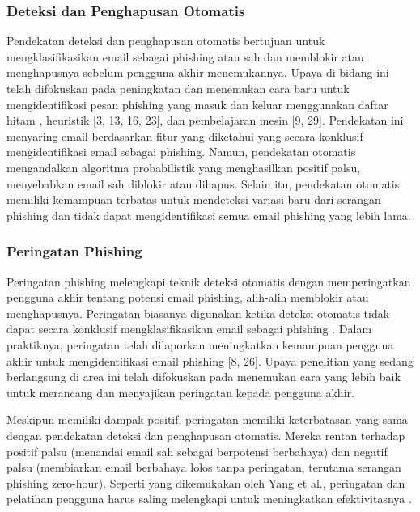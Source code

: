 \documentclass[lettersize,journal]{IEEEtran}
\begin{document}
\subsubsection{Deteksi dan Penghapusan Otomatis}
Pendekatan deteksi dan penghapusan otomatis bertujuan untuk mengklasifikasikan
email sebagai phishing atau sah dan memblokir atau menghapusnya sebelum
pengguna akhir menemukannya. Upaya di bidang ini telah difokuskan pada
peningkatan dan menemukan cara baru untuk mengidentifikasi pesan phishing yang
masuk dan keluar menggunakan daftar hitam \cite{satunol}, heuristik [3, 13, 16,
    23], dan pembelajaran mesin [9, 29]. Pendekatan ini menyaring email berdasarkan
fitur yang diketahui yang secara konklusif mengidentifikasi email sebagai
phishing. Namun, pendekatan otomatis mengandalkan algoritma probabilistik yang
menghasilkan positif palsu, menyebabkan email sah diblokir atau dihapus. Selain
itu, pendekatan otomatis memiliki kemampuan terbatas untuk mendeteksi variasi
baru dari serangan phishing \cite{satudua} dan tidak dapat mengidentifikasi
semua email phishing yang lebih lama.

\subsubsection{Peringatan Phishing}
Peringatan phishing melengkapi teknik deteksi otomatis dengan memperingatkan
pengguna akhir tentang potensi email phishing, alih-alih memblokir atau
menghapusnya. Peringatan biasanya digunakan ketika deteksi otomatis tidak dapat
secara konklusif mengklasifikasikan email sebagai phishing \cite{dualima}.
Dalam praktiknya, peringatan telah dilaporkan meningkatkan kemampuan pengguna
akhir untuk mengidentifikasi email phishing [8, 26]. Upaya penelitian yang
sedang berlangsung di area ini telah difokuskan pada menemukan cara yang lebih
baik untuk merancang dan menyajikan peringatan kepada pengguna akhir.

Meskipun memiliki dampak positif, peringatan memiliki keterbatasan yang sama
dengan pendekatan deteksi dan penghapusan otomatis. Mereka rentan terhadap
positif palsu (menandai email sah sebagai berpotensi berbahaya) dan negatif
palsu (membiarkan email berbahaya lolos tanpa peringatan, terutama serangan
phishing zero-hour). Seperti yang dikemukakan oleh Yang et al., peringatan dan
pelatihan pengguna harus saling melengkapi untuk meningkatkan efektivitasnya
\cite{tigatujuh}.
\end{document}
